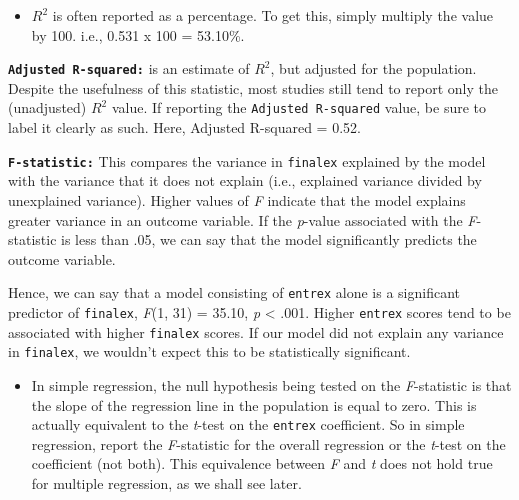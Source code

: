 \documentclass[
]{book}
\providecommand{\tightlist}{%
  \setlength{\itemsep}{0pt}\setlength{\parskip}{0pt}}
\theoremstyle{definition}
\theoremstyle{definition}
\theoremstyle{definition}
\theoremstyle{definition}
\theoremstyle{remark}
\begin{document}
\begin{itemize}
\tightlist
\item
  \(R^2\) is often reported as a percentage. To get this, simply multiply the value by 100. i.e., 0.531 x 100 = 53.10\%.
\end{itemize}

\hfill\break
\textbf{\texttt{Adjusted\ R-squared:}} is an estimate of \(R^2\), but adjusted for the population. Despite the usefulness of this statistic, most studies still tend to report only the (unadjusted) \(R^2\) value. If reporting the \texttt{Adjusted\ R-squared} value, be sure to label it clearly as such. Here, Adjusted R-squared = 0.52.

\hfill\break
\textbf{\texttt{F-statistic:}} This compares the variance in \texttt{finalex} explained by the model with the variance that it does not explain (i.e., explained variance divided by unexplained variance). Higher values of \emph{F} indicate that the model explains greater variance in an outcome variable. If the \emph{p}-value associated with the \emph{F}-statistic is less than .05, we can say that the model significantly predicts the outcome variable.

Hence, we can say that a model consisting of \texttt{entrex} alone is a significant predictor of \texttt{finalex}, \emph{F}(1, 31) = 35.10, \emph{p} \textless{} .001. Higher \texttt{entrex} scores tend to be associated with higher \texttt{finalex} scores. If our model did not explain any variance in \texttt{finalex}, we wouldn't expect this to be statistically significant.

\begin{itemize}
\tightlist
\item
  In simple regression, the null hypothesis being tested on the \emph{F}-statistic is that the slope of the regression line in the population is equal to zero. This is actually equivalent to the \emph{t}-test on the \texttt{entrex} coefficient. So in simple regression, report the \emph{F}-statistic for the overall regression or the \emph{t}-test on the coefficient (not both). This equivalence between \emph{F} and \emph{t} does not hold true for multiple regression, as we shall see later.
\end{itemize}
\end{document}
